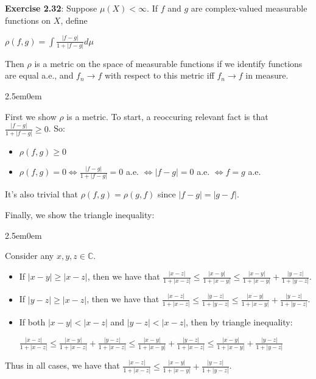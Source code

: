 \documentclass{book}
\newcommand{\exTwoP}{%
   \color{RedViolet}%
   \fontsize{13}{15}\selectfont%
}
\newcommand{\exPPP}{%
   \color{VioletRed}%
   \fontsize{12}{14}\selectfont%
}
\newenvironment{myIndent}{%
   \begin{adjustwidth}{2.5em}{0em}%
}{%
   \end{adjustwidth}%
}
\newcommand{\blab}[1]{\textbf{#1}}
\newcommand{\retTwo}{\hfill\bigbreak}
\begin{document}
\blab{Exercise 2.32}: Suppose $\mu(X) < \infty$. If $f$ and $g$ are complex-valued measurable functions on $X$, define

{\centering $\rho(f, g) = \int\frac{|f - g|}{1 + |f - g|}d\mu$ \retTwo\par}

Then $\rho$ is a metric on the space of measurable functions if we identify functions are equal a.e., and $f_n \rightarrow f$ with respect to this metric iff $f_n \rightarrow f$ in measure.

\begin{myIndent}\exTwoP
	First we show $\rho$ is a metric. To start, a reoccuring relevant fact is that $\frac{|f - g|}{1 + |f - g|} \geq 0$. So:
	
	\begin{itemize}
		\item $\rho(f, g) \geq 0$
		\item $\rho(f, g) = 0 \Longleftrightarrow \frac{|f-g|}{1 + |f-g|} = 0$ a.e. $\Longleftrightarrow |f - g| = 0$ a.e. $\Longleftrightarrow f = g$ a.e.\retTwo
	\end{itemize}

	It's also trivial that $\rho(f, g) = \rho(g, f)$ since $|f - g| = |g - f|$.\retTwo

	Finally, we show the triangle inequality:
	\begin{myIndent}\exPPP
		Consider any $x, y, z \in \mathbb{C}$. 
		\begin{itemize}
			\item If $|x - y| \geq |x - z|$, then we have that $\frac{|x - z|}{1 + |x - z|} \leq \frac{|x - y|}{1 + |x - y|} \leq \frac{|x - y|}{1 + |x - y|} + \frac{|y - z|}{1 + |y - z|}$.
			\item If $|y - z| \geq |x - z|$, then we have that $\frac{|x - z|}{1 + |x - z|} \leq \frac{|y - z|}{1 + |y - z|} \leq \frac{|x - y|}{1 + |x - y|} + \frac{|y - z|}{1 + |y - z|}$.
			\item If both $|x - y| < |x - z|$ and $|y - z| < |x - z|$, then by triangle inequality:
			
			{\centering $\frac{|x - z|}{1 + |x - z|} \leq \frac{|x - y|}{1 + |x - z|} + \frac{|y - z|}{1 + |x - z|} \leq \frac{|x - y|}{1 + |x - y|} + \frac{|y - z|}{1 + |x - z|} \leq \frac{|x - y|}{1 + |x - y|} + \frac{|y - z|}{1 + |y - z|}$ \retTwo\par}
		\end{itemize}

		Thus in all cases, we have that $\frac{|x - z|}{1 + |x - z|} \leq \frac{|x - y|}{1 + |x - y|} + \frac{|y - z|}{1 + |y - z|}$.\retTwo


\end{myIndent}
\end{myIndent}
\end{document}
